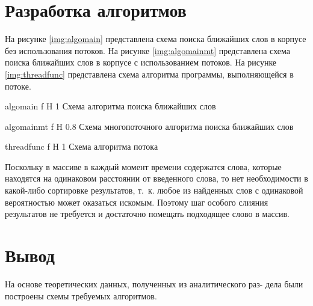 \section{Разработка алгоритмов}

На рисунке \ref{img:algomain} представлена схема поиска ближайших слов в корпусе без использования потоков. 
На рисунке \ref{img:algomainmt} представлена схема поиска ближайших слов в корпусе с использованием потоков. 
На рисунке \ref{img:threadfunc} представлена схема алгоритма программы, выполняющейся в потоке. 


{algomain} %
{f} %
{H} %
{1\textwidth} %
{Схема алгоритма поиска ближайших слов} %


{algomainmt} %
{f} %
{H} %
{0.8\textwidth} %
{Схема многопоточного алгоритма поиска ближайших слов} %


{threadfunc} %
{f} %
{H} %
{1\textwidth} %
{Схема алгоритма потока} %


Поскольку в массиве в каждый момент времени содержатся слова, которые находятся на одинаковом расстоянии от введенного слова, то нет необходимости в какой-либо сортировке результатов, т.~к. любое из найденных слов с одинаковой вероятностью может оказаться искомым. Поэтому шаг особого слияния результатов не требуется и достаточно помещать подходящее слово в массив.

\section*{Вывод}
На основе теоретических данных, полученных из аналитического раз-
дела были построены схемы требуемых алгоритмов. 